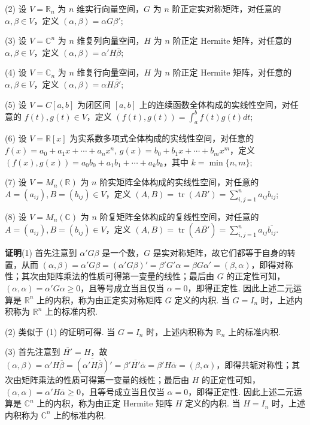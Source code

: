 \documentclass[UTF8, 12pt, fontset=fandol, oneside]{ctexart}
\begin{document}
(2) 设 $V=\mathbb{R}_n$ 为 $n$ 维实行向量空间，$G$ 为 $n$ 阶正定实对称矩阵，对任意的 $\alpha,\beta\in V$，定义 $(\alpha,\beta)=\alpha G\beta'$;

(3) 设 $V=\mathbb{C}^n$ 为 $n$ 维复列向量空间，$H$ 为 $n$ 阶正定 Hermite 矩阵，对任意的 $\alpha,\beta\in V$，定义 $(\alpha,\beta)=\alpha'H\overline{\beta}$;

(4) 设 $V=\mathbb{C}_n$ 为 $n$ 维复行向量空间，$H$ 为 $n$ 阶正定 Hermite 矩阵，对任意的 $\alpha,\beta\in V$，定义 $(\alpha,\beta)=\alpha H\overline{\beta'}$;

(5) 设 $V=C[a,b]$ 为闭区间 $[a,b]$ 上的连续函数全体构成的实线性空间，对任意的 $f(t),g(t)\in V$，定义 $(f(t),g(t))=\int_a^b f(t)g(t)dt$;

(6) 设 $V=\mathbb{R}[x]$ 为实系数多项式全体构成的实线性空间，对任意的 $f(x)=a_0+a_1x+\cdots+a_nx^n$, $g(x)=b_0+b_1x+\cdots+b_mx^m$，定义 $(f(x),g(x))=a_0b_0+a_1b_1+\cdots+a_kb_k$，其中 $k=\min\{n,m\}$;

(7) 设 $V=M_n(\mathbb{R})$ 为 $n$ 阶实矩阵全体构成的实线性空间，对任意的 $A=(a_{ij}),B=(b_{ij})\in V$，定义 $(A,B)=\operatorname{tr}(AB')=\sum_{i,j=1}^n a_{ij}b_{ij}$;

(8) 设 $V=M_n(\mathbb{C})$ 为 $n$ 阶复矩阵全体构成的复线性空间，对任意的 $A=(a_{ij}),B=(b_{ij})\in V$，定义 $(A,B)=\operatorname{tr}(A\overline{B'})=\sum_{i,j=1}^n a_{ij}\overline{b_{ij}}$.

\noindent\textbf{证明}\quad (1) 首先注意到 $\alpha'G\beta$ 是一个数，$G$ 是实对称矩阵，故它们都等于自身的转置，从而 $(\alpha,\beta)=\alpha'G\beta=(\alpha'G\beta)'=\beta'G'\alpha=\beta G\alpha'=(\beta,\alpha)$，即得对称性；其次由矩阵乘法的性质可得第一变量的线性；最后由 $G$ 的正定性可知，$(\alpha,\alpha)=\alpha'G\alpha\ge 0$，且等号成立当且仅当 $\alpha=0$，即得正定性. 因此上述二元运算是 $\mathbb{R}^n$ 上的内积，称为由正定实对称矩阵 $G$ 定义的内积. 当 $G=I_n$ 时，上述内积称为 $\mathbb{R}^n$ 上的标准内积.

(2) 类似于 (1) 的证明可得. 当 $G=I_n$ 时，上述内积称为 $\mathbb{R}_n$ 上的标准内积.

(3) 首先注意到 $\overline{H'}=H$，故 $(\alpha,\beta)=\alpha'H\overline{\beta}=(\overline{\alpha'H\overline{\beta}})'=\beta'\overline{H'}\overline{\alpha}=\beta'H\overline{\alpha}=(\beta,\alpha)$，即得共轭对称性；其次由矩阵乘法的性质可得第一变量的线性；最后由 $H$ 的正定性可知，$(\alpha,\alpha)=\alpha'H\overline{\alpha}\ge 0$，且等号成立当且仅当 $\alpha=0$，即得正定性. 因此上述二元运算是 $\mathbb{C}^n$ 上的内积，称为由正定 Hermite 矩阵 $H$ 定义的内积. 当 $H=I_n$ 时，上述内积称为 $\mathbb{C}^n$ 上的标准内积.
\end{document}
